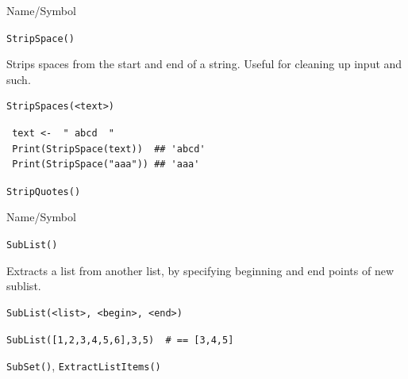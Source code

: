 \begin{desc}{Name/Symbol}
\item[Name/Symbol]  	\verb+StripSpace()+

\item[Description] 	Strips spaces from the start and end of a
  string.  Useful for cleaning up input and such.


\item[Usage]
\begin{verbatim}
StripSpaces(<text>)
\end{verbatim}

\item[Example]     	
\begin{verbatim}
 text <-  " abcd  "
 Print(StripSpace(text))  ## 'abcd'
 Print(StripSpace("aaa")) ## 'aaa'
\end{verbatim}

\item[See Also]    	\verb+StripQuotes()+
\end{desc}




\begin{desc}{Name/Symbol}
\item[Name/Symbol]  	\verb+SubList()+

\item[Description] 	Extracts a list from another list, by specifying 
	     	beginning and end points of new sublist.

\item[Usage]
\begin{verbatim}
SubList(<list>, <begin>, <end>)
\end{verbatim}

\item[Example]     	
\begin{verbatim}
SubList([1,2,3,4,5,6],3,5)	# == [3,4,5]
\end{verbatim}

\item[See Also]    	\verb+SubSet()+, \verb+ExtractListItems()+
\end{desc}




